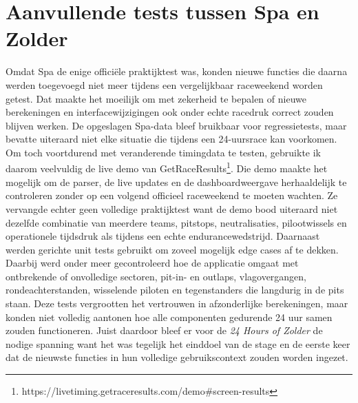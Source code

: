 \section{Aanvullende tests tussen Spa en Zolder}
Omdat Spa de enige officiële praktijktest was, konden nieuwe functies die daarna werden toegevoegd
niet meer tijdens een vergelijkbaar raceweekend worden getest. Dat maakte het moeilijk om met
zekerheid te bepalen of nieuwe berekeningen en interfacewijzigingen ook onder echte racedruk correct
zouden blijven werken. De opgeslagen Spa-data bleef bruikbaar voor regressietests, maar bevatte
uiteraard niet elke situatie die tijdens een 24-uursrace kan voorkomen.
Om toch voortdurend met veranderende timingdata te testen, gebruikte ik daarom veelvuldig de live
demo van GetRaceResults\footnote{https://livetiming.getraceresults.com/demo\#screen-results}. Die demo maakte het mogelijk om de parser, de live updates en de
dashboardweergave herhaaldelijk te controleren zonder op een volgend officieel raceweekend te moeten
wachten. Ze vervangde echter geen volledige praktijktest want de demo bood uiteraard niet dezelfde combinatie van
meerdere teams, pitstops, neutralisaties, pilootwissels en operationele tijdsdruk als tijdens een
echte endurancewedstrijd.
Daarnaast werden gerichte unit tests gebruikt om zoveel mogelijk edge cases af te dekken. Daarbij
werd onder meer gecontroleerd hoe de applicatie omgaat met ontbrekende of onvolledige sectoren,
pit-in- en outlaps, vlagovergangen, rondeachterstanden, wisselende piloten en tegenstanders die
langdurig in de pits staan. Deze tests vergrootten het vertrouwen in afzonderlijke berekeningen,
maar konden niet volledig aantonen hoe alle componenten gedurende 24 uur samen zouden functioneren.
Juist daardoor bleef er voor de \emph{24 Hours of Zolder} de nodige spanning want het was tegelijk het
einddoel van de stage en de eerste keer dat de nieuwste functies in hun volledige gebruikscontext
zouden worden ingezet.


